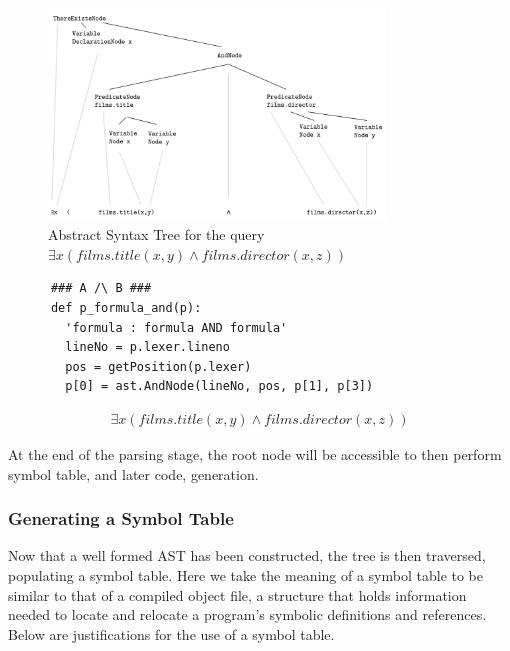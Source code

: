 \documentclass[a4paper, 11pt]{article}
\begin{document}
      \begin{figure}
      \centering
      \includegraphics[width=0.8\textwidth]{images/ASTComplex.png}
      \caption{Abstract Syntax Tree for the query $
        \exists x(films.title(x, y) \land films.director(x, z))$}
      \label{fig:complexAST}
      \end{figure}
      \begin{verbatim}
      ### A /\ B ###
      def p_formula_and(p):
        'formula : formula AND formula'
        lineNo = p.lexer.lineno
        pos = getPosition(p.lexer)
        p[0] = ast.AndNode(lineNo, pos, p[1], p[3])
      \end{verbatim}
      \begin{gather}
        \exists x(films.title(x, y) \land films.director(x, z))
      \end{gather}

      At the end of the parsing stage, the root
      node will be accessible to then perform symbol table, and later code,
      generation.

    \subsubsection{Generating a Symbol Table}

      Now that a well formed AST has been constructed, the tree is then
      traversed, populating a symbol table. Here we take the meaning of a
      symbol table to be similar to that of a compiled object file, a structure
      that holds information needed to locate and relocate a program's symbolic
      definitions and references\cite{symtab}. Below are justifications for the
      use of a symbol table.
\end{document}

